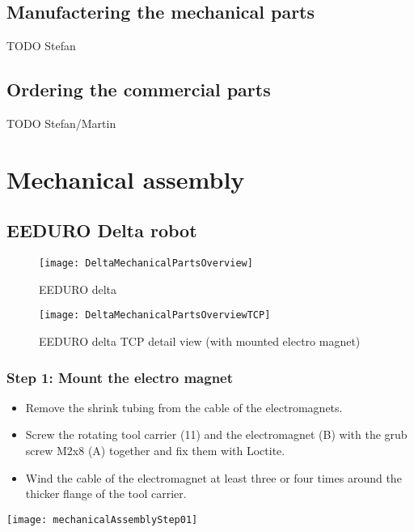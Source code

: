 \subsection{Manufactering the mechanical parts}
TODO Stefan

\subsection{Ordering the commercial parts}
TODO Stefan/Martin

\section{Mechanical assembly}

\subsection{EEDURO Delta robot}

\begin{figure}[htbp]
	\centering
	\texttt{[image: DeltaMechanicalPartsOverview]}
	\caption{EEDURO delta}
	\label{fig:DeltaMechanicalPartsOverview}
\end{figure}

\begin{figure}[htbp]
	\centering
	\texttt{[image: DeltaMechanicalPartsOverviewTCP]}
	\caption{EEDURO delta TCP detail view (with mounted electro magnet)}
	\label{fig:DeltaMechanicalPartsOverviewTCP}
\end{figure}

\subsubsection{Step 1: Mount the electro magnet}

\begin{minipage}[t]{0.6\textwidth}
	\begin{itemize}
		\item Remove the shrink tubing from the cable of the electromagnets.
		\item Screw the rotating tool carrier (11) and the electromagnet (B) with the grub screw M2x8 (A) together and fix them with Loctite. 
		\item Wind the cable of the electromagnet at least three or four times around the thicker flange of the tool carrier.
	\end{itemize}
\end{minipage}
\hfill
\begin{minipage}[t]{0.35\textwidth}
	\vspace{-\ht\strutbox}\texttt{[image: mechanicalAssemblyStep01]}
	\label{fig:MechanicalAssebmlyStep01}
\end{minipage}

